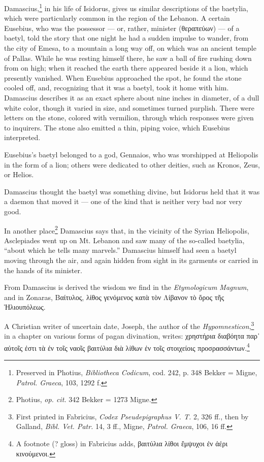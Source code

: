\documentclass[a4paper, 12pt, oneside, polutonikogreek, english]{article}
\begin{document}
Damascius,\footnote{Preserved in Photius, \emph{Bibliotheca Codicum}, cod. 242, p. 348 Bekker = Migne, \emph{Patrol. Graeca}, 103, 1292 f.} in his life of Isidorus, gives us similar descriptions of the baetylia, which were particularly common in the region of the Lebanon. A certain Eusebius, who was the possessor --- or, rather, minister (θεραπεύων) --- of a baetyl, told the story that one night he had a sudden impulse to wander, from the city of Emesa, to a mountain a long way off, on which was an ancient temple of Pallas. While he was resting himself there, he saw a ball of fire rushing down from on high; when it reached the earth there appeared beside it a lion, which presently vanished. When Eusebius approached the spot, he found the stone cooled off, and, recognizing that it was a baetyl, took it home with him. Damascius describes it as an exact sphere about nine inches in diameter, of a dull white color, though it varied in size, and sometimes turned purplish. There were letters on the stone, colored with vermilion, through which responses were given to inquirers. The stone also emitted a thin, piping voice, which Eusebius interpreted.

Eusebius's baetyl belonged to a god, Gennaios, who was worshipped at Heliopolis in the form of a lion; others were dedicated to other deities, such as Kronos, Zeus, or Helios.

Damascius thought the baetyl was something divine, but Isidorus held that it was a daemon that moved it --- one of the kind that is neither very bad nor very good.

In another place\footnote{Photius, \emph{op. cit.} 342 Bekker = 1273 Migne.} Damascius says that, in the vicinity of the Syrian Heliopolis, Asclepiades went up on Mt. Lebanon and saw many of the so-called baetylia, ``about which he tells many marvels.'' Damascius himself had seen a baetyl moving through the air, and again hidden from sight in its garments or carried in the hands of its minister.

From Damascius is derived the wisdom we find in the \emph{Etymologicum Magnum}, and in Zonaras, Βαίτυλος, λίθος γενόμενος κατὰ τὸν Λίβανον τὸ ὄρος τῆς Ἡλιουπόλεως.

A Christian writer of uncertain date, Joseph, the author of the \emph{Hypomnesticon},\footnote{First printed in Fabricius, \emph{Codex Pseudepigraphus V. T.} 2, 326 ff., then by Galland, \emph{Bibl. Vet. Patr.} 14, 3 ff., Migne, \emph{Patrol. Graeca}, 106, 16 ff.} in a chapter on various forms of pagan divination, writes: χρηστήρια διαβόητα παρ᾽ αὐτοῖς ἐστι τὰ ἐν τοῖς ναοῖς βαιτύλια διὰ λίθων ἐν τοῖς στοιχείοις προσρασσάντων.\footnote{A footnote (? gloss) in Fabricius adds, βαιτύλια λίθοι ἔμψυχοι ἐν ἀέρι κινούμενοι.}
\end{document}
